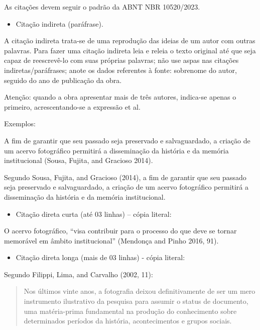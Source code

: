 \documentclass[
]{article}
\providecommand{\tightlist}{%
  \setlength{\itemsep}{0pt}\setlength{\parskip}{0pt}}
\begin{document}
As citações devem seguir o padrão da ABNT NBR 10520/2023.

\begin{itemize}
\tightlist
\item
  Citação indireta (paráfrase).
\end{itemize}

A citação indireta trata-se de uma reprodução das ideias de um autor com
outras palavras. Para fazer uma citação indireta leia e releia o texto
original até que seja capaz de reescrevê-lo com suas próprias palavras;
não use aspas nas citações indiretas/paráfrases; anote os dados
referentes à fonte: sobrenome do autor, seguido do ano de publicação da
obra.

Atenção: quando a obra apresentar mais de três autores, indica-se apenas
o primeiro, acrescentando-se a expressão et al.

Exemplos:

A fim de garantir que seu passado seja preservado e salvaguardado, a
criação de um acervo fotográfico permitirá a disseminação da história e
da memória institucional (Sousa, Fujita, and Gracioso 2014).

Segundo Sousa, Fujita, and Gracioso (2014), a fim de garantir que seu
passado seja preservado e salvaguardado, a criação de um acervo
fotográfico permitirá a disseminação da história e da memória
institucional.

\begin{itemize}
\tightlist
\item
  Citação direta curta (até 03 linhas) -- cópia literal:
\end{itemize}

O acervo fotográfico, ``visa contribuir para o processo do que deve se
tornar memorável em âmbito institucional'' (Mendonça and Pinho 2016,
91).

\begin{itemize}
\tightlist
\item
  Citação direta longa (mais de 03 linhas) - cópia literal:
\end{itemize}

Segundo Filippi, Lima, and Carvalho (2002, 11):

\begin{quote}
Nos últimos vinte anos, a fotografia deixou definitivamente de ser um
mero instrumento ilustrativo da pesquisa para assumir o status de
documento, uma matéria-prima fundamental na produção do conhecimento
sobre determinados períodos da história, acontecimentos e grupos
sociais.
\end{quote}
\end{document}
